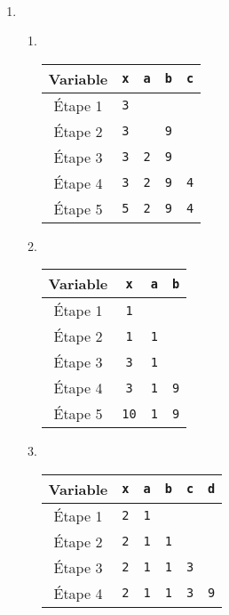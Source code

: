 \begin{correction}~
	\begin{enumerate}
		\item \begin{enumerate}
			\item ~\begin{center}
		\begin{tabular}{|c|c|c|c|c|}
			\hline
			Variable &\texttt{x}&\texttt{a}&\texttt{b}&\texttt{c} \\\hline
			Étape 1 &\texttt{3}&&&\\\hline
			Étape 2 &\texttt{3}&&\texttt{9}&\\\hline
			Étape 3 &\texttt{3}&\texttt{2}&\texttt{9}&\\\hline
			Étape 4 &\texttt{3}&\texttt{2}&\texttt{9}&\texttt{4}\\\hline
			Étape 5 &\texttt{5}&\texttt{2}&\texttt{9}&\texttt{4}\\\hline
		\end{tabular}\end{center}
	\item ~\begin{center}
			\begin{tabular}{|c|c|c|c|}
			\hline
			Variable &\texttt{x}&\texttt{a}&\texttt{b} \\\hline
			Étape 1 &\texttt{1}&&\\\hline
			Étape 2 &\texttt{1}&\texttt{1}&\\\hline
			Étape 3 &\texttt{3}&\texttt{1}&\\\hline
			Étape 4 &\texttt{3}&\texttt{1}&\texttt{9}\\\hline
			Étape 5 &\texttt{10}&\texttt{1}&\texttt{9}\\\hline
		\end{tabular}\end{center}
		\item ~\begin{center}
		\begin{tabular}{|c|c|c|c|c|c|}
			\hline
			Variable &\texttt{x}&\texttt{a}&\texttt{b}&\texttt{c}&\texttt{d} \\\hline
			Étape 1 &\texttt{2}&\texttt{1}&&&\\\hline
			Étape 2 &\texttt{2}&\texttt{1}&\texttt{1}&&\\\hline
			Étape 3 &\texttt{2}&\texttt{1}&\texttt{1}&\texttt{3}&\\\hline
			Étape 4 &\texttt{2}&\texttt{1}&\texttt{1}&\texttt{3}&\texttt{9}\\\hline

\end{tabular}
\end{center}
\end{enumerate}
\end{enumerate}
\end{correction}
